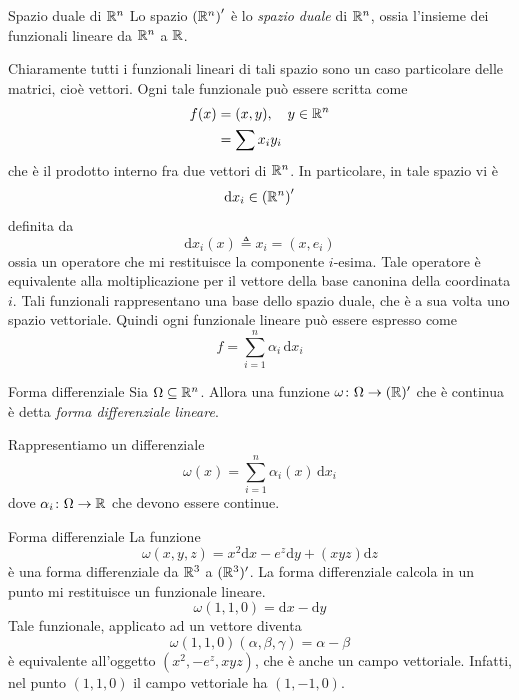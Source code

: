 \documentclass[a4paper]{article}
\begin{document}
\begin{radioactive}
\begin{snippetdefinition}{Spazio duale di \({\mathbb{R}^n}\)}
    Lo spazio \(\left(\mathbb{R}^n\right)'\)
    è lo \emph{spazio duale} di \(\mathbb{R}^n\),
    ossia l'insieme dei funzionali lineare da \(\mathbb{R}^n\)
    a \(\mathbb{R}\).
\end{snippetdefinition}

Chiaramente tutti i funzionali lineari di tali spazio sono un caso particolare
delle matrici, cioè vettori. Ogni tale funzionale può essere scritta come
\begin{align*}
    f(x) &= (x,y), \quad y\in \mathbb{R}^n \\
    &= \sum x_i y_i
\end{align*}
che è il prodotto interno fra due vettori di \(\mathbb{R}^n\).
In particolare, in tale spazio vi è
\[
    \text{d}x_i \in \left(\mathbb{R}^n\right)'
\]
definita da
\[
    \text{d}x_i(x) \triangleq x_i = (x, e_i)
\]
ossia un operatore che mi restituisce la componente \(i\)-esima.
Tale operatore è equivalente alla moltiplicazione per il vettore della base
canonina della coordinata \(i\).
Tali funzionali rappresentano una base dello spazio duale, che è a sua volta uno spazio vettoriale.
Quindi ogni funzionale lineare può essere espresso come
\[
    f = \sum_{i=1}^n \alpha_i \,\text{d}x_i
\]

\begin{snippetdefinition}{Forma differenziale}
    Sia \(\Omega \subseteq \mathbb{R}^n\).
    Allora una funzione \(\omega \colon \Omega \to (\mathbb{R})'\)
    che è continua è detta \emph{forma differenziale lineare}.
\end{snippetdefinition}

Rappresentiamo un differenziale
\[
    \omega(x) = \sum_{i=1}^n \alpha_i(x) \,\text{d}x_i
\]
dove \(\alpha_i \colon \Omega \to \mathbb{R}\) che devono essere continue.
\end{radioactive}

\begin{radioactive}
\begin{snippetexample}{Forma differenziale}
    La funzione
    \[
        \omega(x,y,z) = x^2\text{d}x - e^z \text{d}y + (xyz)\text{d}z
    \]
    è una forma differenziale da \(\mathbb{R}^3\) a \((\mathbb{R}^3)'\).
    La forma differenziale calcola in un punto mi restituisce un funzionale lineare.
    \[
        \omega(1,1,0) = \text{d}x - \text{d}y
    \]
    Tale funzionale, applicato ad un vettore diventa
    \[
        \omega(1,1,0)(\alpha, \beta, \gamma) = \alpha - \beta
    \]
    è equivalente all'oggetto \((x^2, -e^z, xyz)\), che è anche un campo vettoriale.
    Infatti, nel punto \((1,1,0)\) il campo vettoriale ha \((1, -1, 0)\).
\end{snippetexample}
\end{radioactive}
\end{document}
